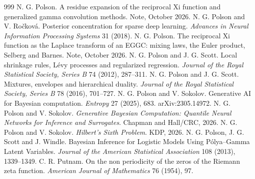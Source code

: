 \begin{thebibliography}{999}
 N. G. Polson. A residue expansion of the reciprocal Xi function and generalized gamma convolution methods. Note, October 2026.
 N. G. Polson and V. Ro\v{c}kov\'a. Posterior concentration for sparse deep learning. \emph{Advances in Neural Information Processing Systems} 31 (2018).
 N. G. Polson. The reciprocal Xi function as the Laplace transform of an EGGC: mixing laws, the Euler product, Selberg and Barnes. Note, October 2026.
 N. G. Polson and J. G. Scott. Local shrinkage rules, L\'evy processes and regularized regression. \emph{Journal of the Royal Statistical Society, Series B} 74 (2012), 287--311.
 N. G. Polson and J. G. Scott. Mixtures, envelopes and hierarchical duality. \emph{Journal of the Royal Statistical Society, Series B} 78 (2016), 701--727.
 N. G. Polson and V. Sokolov. Generative AI for Bayesian computation. \emph{Entropy} 27 (2025), 683. arXiv:2305.14972.
 N. G. Polson and V. Sokolov. \emph{Generative Bayesian Computation: Quantile Neural Networks for Inference and Surrogates}. Chapman and Hall/CRC, 2026.
 N. G. Polson and V. Sokolov. \emph{Hilbert's Sixth Problem}. KDP, 2026.
 N. G. Polson, J. G. Scott and J. Windle. Bayesian Inference for Logistic Models Using P\'olya--Gamma Latent Variables. \emph{Journal of the American Statistical Association} 108 (2013), 1339--1349.
 C. R. Putnam. On the non periodicity of the zeros of the Riemann zeta function. \emph{American Journal of Mathematics} 76 (1954), 97.

\end{thebibliography}

